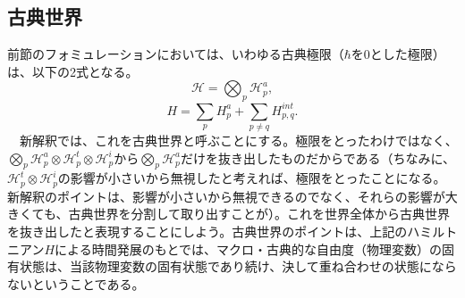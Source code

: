 \subsection{古典世界}
前節のフォミュレーションにおいては、いわゆる古典極限（$\hbar$を$0$とした極限）は、以下の2式となる。
\begin{equation}
    \mathcal{H} = \bigotimes_p \mathcal{H}_p^a,
\end{equation}
\begin{equation}
H=\sum_pH_p^a+ \sum_{p \neq q} H^{int}_{p,q}.
\end{equation}
　新解釈では、これを古典世界と呼ぶことにする。極限をとったわけではなく、$\bigotimes_p \mathcal{H}_p^a \otimes  \mathcal{H}_p^t \otimes  \mathcal{H}_p^i$から$\bigotimes_p \mathcal{H}_p^a$だけを抜き出したものだからである（ちなみに、$\mathcal{H}_p^t \otimes  \mathcal{H}_p^i$の影響が小さいから無視したと考えれば、極限をとったことになる。新解釈のポイントは、影響が小さいから無視できるのでなく、それらの影響が大きくても、古典世界を分割して取り出すことが）。これを世界全体から古典世界を抜き出したと表現することにしよう。古典世界のポイントは、上記のハミルトニアン$H$による時間発展のもとでは、マクロ・古典的な自由度（物理変数）の固有状態は、当該物理変数の固有状態であり続け、決して重ね合わせの状態にならないということである。